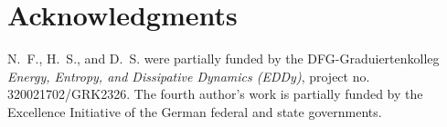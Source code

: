 \section*{Acknowledgments}
N.~F.{}, H.~S.{}, and D.~S.{} were  
partially funded by  {the DFG}-Graduiertenkolleg \emph{Energy, Entropy, and Dissipative Dynamics (EDDy)},  project no. 320021702/GRK2326.
The fourth author's work is partially funded by 
the Excellence Initiative of the German federal and state governments.